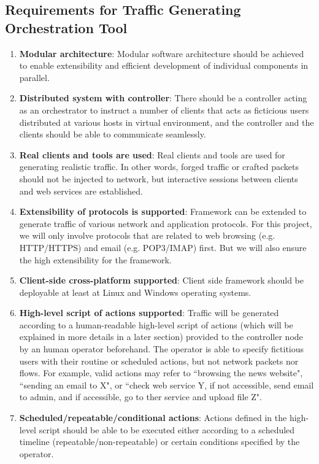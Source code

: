 \documentclass[12pt]{report}
\begin{document}
\subsection{Requirements for Traffic Generating Orchestration Tool}
\label{framework-requirements}
\begin{enumerate}
\item \textbf{Modular architecture}: Modular software architecture should be achieved to enable extensibility and efficient development of individual components in parallel.
\item \textbf{Distributed system with controller}: There should be a controller acting as an orchestrator to instruct a number of clients that acts as ficticious users distributed at various hosts in virtual environment, and the controller and the clients should be able to communicate seamlessly.
\item \textbf{Real clients and tools are used}: Real clients and tools are used for generating realistic traffic. In other words, forged traffic or crafted packets should not be injected to network, but interactive sessions between clients and web services are established.
\item \textbf{Extensibility of protocols is supported}: Framework can be extended to generate traffic of various network and application protocols. For this project, we will only involve protocols that are related to web browsing (e.g. HTTP/HTTPS) and email (e.g. POP3/IMAP) first. But we will also ensure the high extensibility for the framework.
\item \textbf{Client-side cross-platform supported}: Client side framework should be deployable at least at Linux and Windows operating systems.
\item \textbf{High-level script of actions supported}: Traffic will be generated according to a human-readable high-level script of actions (which will be explained in more details in a later section) provided to the controller node by an human operator beforehand. The operator is able to specify fictitious users with their routine or scheduled actions, but not network packets nor flows. For example, valid actions may refer to ``browsing the news website", ``sending an email to X", or ``check web service Y, if not accessible, send email to admin, and if accessible, go to ther service and upload file Z".
\item \textbf{Scheduled/repeatable/conditional actions}: Actions defined in the high-level script should be able to be executed either according to a scheduled timeline (repeatable/non-repeatable) or certain conditions specified by the operator.

\end{enumerate}
\end{document}
